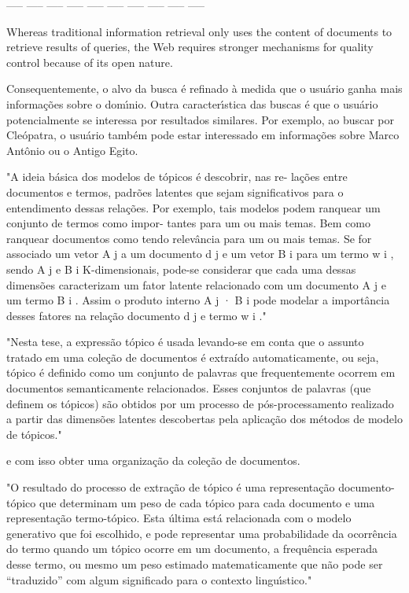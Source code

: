 ----- ----- ----- ----- ----- ----- ----- ----- ----- ----- 


Whereas traditional information retrieval only uses the content of documents to
retrieve results of queries, the Web requires stronger mechanisms for quality control because
of its open nature.



Consequentemente, o alvo da busca é refinado à medida que o usuário ganha mais informações sobre o domı́nio. Outra caracterı́stica das buscas é que o usuário potencialmente se interessa por resultados similares. Por exemplo, ao buscar por Cleópatra, o usuário também pode estar interessado em informações sobre Marco Antônio ou o Antigo Egito.



"A ideia básica dos modelos de tópicos é descobrir, nas re- lações entre documentos e termos, padrões latentes que sejam significativos para o entendimento dessas relações. Por exemplo, tais modelos podem ranquear um conjunto de termos como impor- tantes para um ou mais temas. Bem como ranquear documentos como tendo relevância para um ou mais temas. Se for associado um vetor A j a um documento d j e um vetor B i para um termo w i , sendo A j e B i K-dimensionais, pode-se considerar que cada uma dessas dimensões caracterizam um fator latente relacionado com um documento A j e um termo B i . Assim o produto interno A j · B i pode modelar a importância desses fatores na relação documento d j e termo w i ."




"Nesta tese, a expressão tópico é usada levando-se em conta que o assunto tratado em uma coleção de documentos é extraído automaticamente, ou seja, tópico é definido como um conjunto de palavras que frequentemente ocorrem em documentos semanticamente relacionados. Esses conjuntos de palavras (que definem os tópicos) são obtidos por um processo de pós-processamento realizado a partir das dimensões latentes descobertas pela aplicação dos métodos de modelo de tópicos."  



e com isso obter uma organização da coleção de documentos.










"O resultado do processo de extração de tópico é uma representação documento-tópico que determinam um peso de cada tópico para cada documento e uma representação termo-tópico. Esta última está relacionada com o modelo generativo que foi escolhido, e pode representar uma probabilidade da ocorrência do termo quando um tópico ocorre em um documento, a frequência esperada desse termo, ou mesmo um peso estimado matematicamente que não pode ser “traduzido” com algum significado para o contexto linguı́stico."



